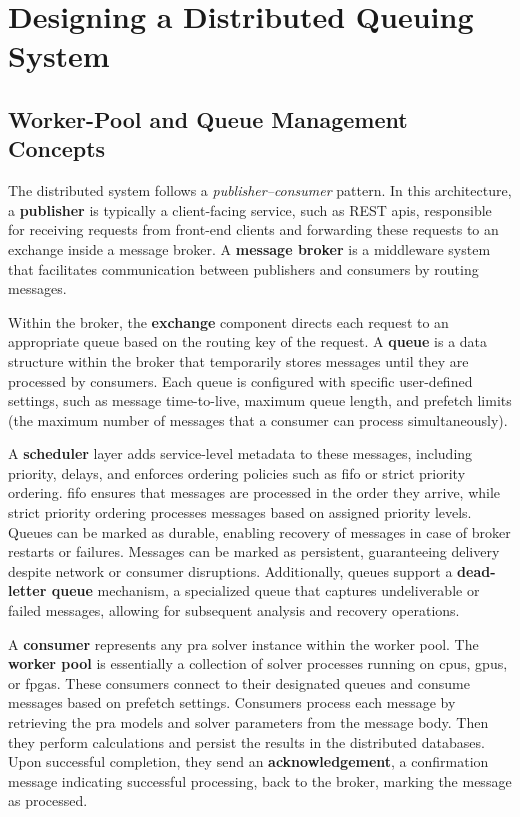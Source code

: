 {
\cleardoublepage
\let\clearpage\relax


\chapter{Designing a Distributed Queuing System}

\section{Worker-Pool and Queue Management Concepts}

The distributed system follows a \emph{publisher--consumer} pattern. In this architecture, a \textbf{publisher} is typically a client-facing service, such as REST \acrshort{api}s, responsible for receiving requests from front-end clients and forwarding these requests to an exchange inside a message broker. A \textbf{message broker} is a middleware system that facilitates communication between publishers and consumers by routing messages.

Within the broker, the \textbf{exchange} component directs each request to an appropriate queue based on the routing key of the request. A \textbf{queue} is a data structure within the broker that temporarily stores messages until they are processed by consumers. Each queue is configured with specific user-defined settings, such as message time-to-live, maximum queue length, and prefetch limits (the maximum number of messages that a consumer can process simultaneously).

A \textbf{scheduler} layer adds service-level metadata to these messages, including priority, delays, and enforces ordering policies such as \acrshort{fifo} or strict priority ordering. \acrshort{fifo} ensures that messages are processed in the order they arrive, while strict priority ordering processes messages based on assigned priority levels. Queues can be marked as durable, enabling recovery of messages in case of broker restarts or failures. Messages can be marked as persistent, guaranteeing delivery despite network or consumer disruptions. Additionally, queues support a \textbf{dead-letter queue} mechanism, a specialized queue that captures undeliverable or failed messages, allowing for subsequent analysis and recovery operations.

A \textbf{consumer} represents any \acrshort{pra} solver instance within the worker pool. The \textbf{worker pool} is essentially a collection of solver processes running on \acrshort{cpu}s, \acrshort{gpu}s, or \acrshort{fpga}s. These consumers connect to their designated queues and consume messages based on prefetch settings. Consumers process each message by retrieving the \acrshort{pra} models and solver parameters from the message body. Then they perform calculations and persist the results in the distributed databases. Upon successful completion, they send an \textbf{acknowledgement}, a confirmation message indicating successful processing, back to the broker, marking the message as processed.

}
